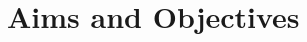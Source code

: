 \documentclass[../main.tex]{subfiles}
\begin{document}
\section{Aims and Objectives}
\clearpage
\end{document}
